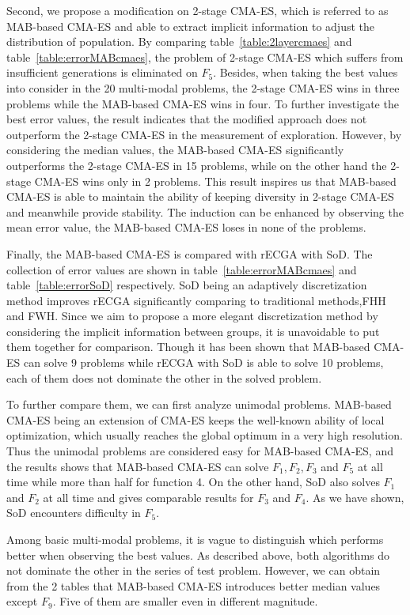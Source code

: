 Second, we propose a modification on 2-stage CMA-ES, which is referred
to as MAB-based CMA-ES and able to extract implicit information to
adjust the distribution of population.
By comparing table~\ref{table:2layercmaes} and
table~\ref{table:errorMABcmaes}, the problem of 2-stage CMA-ES which
suffers from insufficient generations is eliminated on $F_5$.
Besides, when taking the best values into consider in the 20 multi-modal
problems, the 2-stage CMA-ES wins in three problems while the MAB-based
CMA-ES wins in four.
To further investigate the best error values, the result indicates that
the modified approach does not outperform the 2-stage CMA-ES in the
measurement of exploration.
However, by considering the median values, the MAB-based CMA-ES
significantly outperforms the 2-stage CMA-ES in 15 problems, while on the
other hand the 2-stage CMA-ES wins only in 2 problems.
This result inspires us that MAB-based CMA-ES is able to maintain the
ability of keeping diversity in 2-stage CMA-ES and meanwhile provide
stability.
The induction can be enhanced by observing the mean error value, the
MAB-based CMA-ES loses in none of the problems.

Finally, the MAB-based CMA-ES is compared with rECGA with SoD.
The collection of error values are shown in
table~\ref{table:errorMABcmaes} and table~\ref{table:errorSoD}
respectively.
SoD being an adaptively discretization method improves rECGA
significantly comparing to traditional methods,FHH and FWH.
Since we aim to propose a more elegant discretization method by
considering the implicit information between groups, it is unavoidable
to put them together for comparison.
Though it has been shown that MAB-based CMA-ES can solve 9 problems while rECGA
with SoD is able to solve 10 problems, each of them does not dominate
the other in the solved problem.

To further compare them, we can first analyze unimodal problems.
MAB-based CMA-ES being an extension of CMA-ES keeps the well-known ability of local
optimization, which usually reaches the global optimum in a very high resolution.
Thus the unimodal problems are considered easy for MAB-based CMA-ES, and
the results shows that MAB-based CMA-ES can solve $F_1,F_2,F_3$ and
$F_5$ at all time while more than half for function 4.
On the other hand, SoD also solves $F_1$ and $F_2$ at all time and gives
comparable results for $F_3$ and $F_4$.
As we have shown, SoD encounters difficulty in $F_5$.

Among basic multi-modal problems, it is vague to distinguish which
performs better when observing the best values.
As described above, both algorithms do not dominate the other in the
series of test problem.
However, we can obtain from the 2 tables that MAB-based CMA-ES
introduces better median values except $F_9$. 
Five of them are smaller even in different magnitude.

